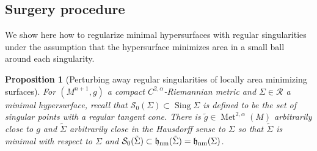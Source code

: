 \documentclass[12pt,twoside]{amsart}
\numberwithin{equation}{section}
\newtheorem{proposition}[theorem]{Proposition}
\renewcommand{\cR}{\mathcal R}
\newcommand{\cS}{\mathcal S}
\DeclareMathOperator{\sing}{Sing}
\DeclareMathOperator{\Met}{Met}
\DeclareMathOperator{\hnm}{\mathfrak{h}_\textnormal{nm}}
\begin{document}
    \subsection{Surgery procedure} We show here how to regularize minimal hypersurfaces with regular singularities under the assumption that the hypersurface minimizes area in a small ball around each singularity. 
    \begin{proposition}[Perturbing away regular singularities of locally area minimizing surfaces]\label{p:surgery}
	For $(M^{n+1},g)$ a compact $C^{2,\alpha}$-Riemannian metric and $\Sigma\in\cR$ a minimal hypersurface, recall that $\cS_0(\Sigma)\subset \sing \Sigma$ is defined to be the set of singular points with a regular tangent cone. There is $\tilde g\in \Met^{2,\alpha}(M)$ arbitrarily close to $g$ and $\tilde \Sigma$ arbitrarily close in the Hausdorff sense to $\Sigma$ so that $\tilde\Sigma$ is minimal with respect to $\Sigma$ and $\cS_0(\tilde\Sigma) \subset \hnm(\tilde\Sigma) = \hnm(\Sigma)$. 
\end{proposition} 
\end{document}
